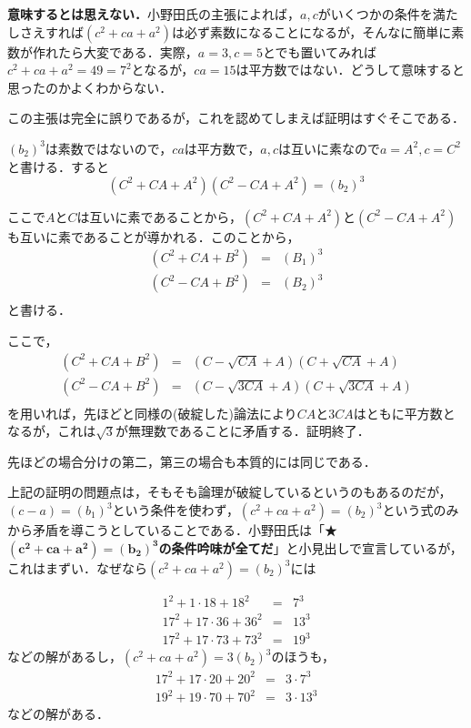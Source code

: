 \textbf{意味するとは思えない．}小野田氏の主張によれば，$a,c$がいくつかの条件を満たしさえすれば$(c^2+ca+a^2)$は必ず素数になることになるが，そんなに簡単に素数が作れたら大変である．実際，$a=3,c=5$とでも置いてみれば$c^2+ca+a^2=49=7^2$となるが，$ca=15$は平方数ではない．どうして意味すると思ったのかよくわからない．

この主張は完全に誤りであるが，これを認めてしまえば証明はすぐそこである．

$(b_2)^3$は素数ではないので，$ca$は平方数で，$a,c$は互いに素なので$a=A^2,c=C^2$と書ける．すると
\[(C^2+CA+A^2)(C^2-CA+A^2)=(b_2)^3\]

ここで$A$と$C$は互いに素であることから，$(C^2+CA+A^2)$と$(C^2-CA+A^2)$も互いに素であることが導かれる．このことから，
\begin{eqnarray*}
(C^2+CA+B^2)&=&(B_1)^3\\
(C^2-CA+B^2)&=&(B_2)^3\\
\end{eqnarray*}
と書ける．

ここで，
\begin{eqnarray*}
(C^2+CA+B^2)&=&(C-\sqrt{CA}+A)(C+\sqrt{CA}+A)\\
(C^2-CA+B^2)&=&(C-\sqrt{3CA}+A)(C+\sqrt{3CA}+A)\\
\end{eqnarray*}
を用いれば，先ほどと同様の(破綻した)論法により$CA$と$3CA$はともに平方数となるが，これは$\sqrt{3}$が無理数であることに矛盾する．証明終了．

先ほどの場合分けの第二，第三の場合も本質的には同じである．


上記の証明の問題点は，そもそも論理が破綻しているというのもあるのだが，$(c-a)=(b_1)^3$という条件を使わず，$(c^2+ca+a^2)=(b_2)^3$という式のみから矛盾を導こうとしていることである．小野田氏は「★$\mathbf{(c^2+ca+a^2)=(b_2)^3}$\textbf{の条件吟味が全てだ}」と小見出しで宣言しているが，これはまずい．なぜなら$(c^2+ca+a^2)=(b_2)^3$には

\begin{eqnarray*}
1^2+1\cdot 18+ 18^2&=&7^3\\
17^2+17\cdot 36+ 36^2&=&13^3\\
17^2+17\cdot 73+ 73^2&=&19^3
\end{eqnarray*}
などの解があるし，$(c^2+ca+a^2)=3(b_2)^3$のほうも，
\begin{eqnarray*}
17^2+17\cdot 20+ 20^2&=&3\cdot 7^3\\
19^2+19\cdot 70+ 70^2&=&3\cdot 13^3
\end{eqnarray*}
などの解がある．

